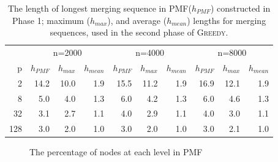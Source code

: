 \documentclass[12pt]{article}
\newcommand{\comment}[2]{{\color{red}{\bf (#1: #2)}}}
\newcommand{\greedyAlgo}{\textsc{Greedy}}
\begin{document}
\begin{table}[ht]
	\center
	\begin{tabular}{r|rrr|rrr|rrr}
 		& \multicolumn{3}{c|}{n=2000} & \multicolumn{3}{c|}{n=4000} & \multicolumn{3}{c}{n=8000} \\
		p &  $h_{PMF}$ &  $h_{max}$ &  $h_{mean}$ &  $h_{PMF}$ &  $h_{max}$ &  $h_{mean}$ &  $h_{PMF}$ &  $h_{max}$ &  $h_{mean}$ \\ \hline
 		2 &  14.2 &  10.0 &  1.9 &  15.5 &  11.2 &  1.9 &  16.9 &  12.1 &  1.9 \\
 		8 &  5.0 &  4.0 &  1.3 &  6.0 &  4.2 &  1.3 &  6.0 &  4.6 &  1.3 \\
		32 &  3.1 &  2.7 &  1.1 &  4.0 &  2.9 &  1.1 &  4.0 &  3.0 &  1.1 \\
		128 &  3.0 &  2.0 &  1.0 &  3.0 &  2.0 &  1.0 &  3.0 &  2.1 &  1.0
	\end{tabular}
	\caption{The length of longest merging sequence in PMF($h_{PMF}$) constructed in Phase 1; maximum ($h_{max}$), and average ($h_{mean}$) lengths for merging sequences, used in the second phase of \greedyAlgo. \comment{sertac}{cerny deneyleri}}
	\label{table:levels}
\end{table}

\begin{figure}[ht]
	\centering
	\caption{The percentage of nodes at each level in PMF \comment{sertac}{distance yerine length yazmak lazim. Daha okunabilir ve diger graphlerle uyumlu bir halini yapmak icin graphlerin exceldeki hallerini bulmam lazim}}
	\label{fig:nodes-at-levels}
\end{figure}
\end{document}
